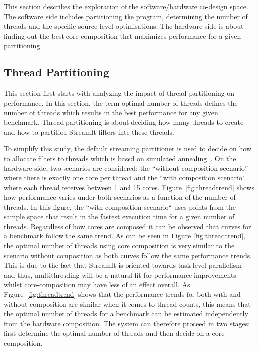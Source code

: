 This section describes the exploration of the software/hardware co-design space.
The software side includes partitioning the program, determining the number of threads and the specific source-level optimisations.
The hardware side is about finding out the best core composition that maximizes performance for a given partitioning.

\subsection{Thread Partitioning}

This section first starts with analyzing the impact of thread partitioning on performance.
In this section, the term optimal number of threads defines the number of threads which results in the best performance for any given benchmark.
Thread partitioning is about deciding how many threads to create and how to partition StreamIt filters into these threads.

To simplify this study, the default streaming partitioner is used to decide on how to allocate filters to threads which is based on simulated annealing~\cite{simulatedAnnealing1983}.
On the hardware side, two scenarios are considered: the ``without composition scenario'' where there is exactly one core per thread and the ``with composition scenario'' where each thread receives between 1 and 15 cores.
Figure~\ref{fig:threadtrend} shows how performance varies under both scenarios as a function of the number of threads.
In this figure, the ``with composition scenario`` uses points from the sample space that result in the fastest execution time for a given number of threads.
Regardless of how cores are composed it can be observed that curves for a benchmark follow the same trend.
As can be seen in Figure~\ref{fig:threadtrend}, the optimal number of threads using core composition is very similar to the scenario without composition as both curves follow the same performance trends.
This is due to the fact that StreamIt is oriented towards task-level parallelism and thus, multithreading will be a natural fit for performance improvements whilst core-composition may have less of an effect overall.
As Figure~\ref{fig:threadtrend} shows that the performance trends for both with and without composition are similar when it comes to thread counts, this  means that the optimal number of threads for a benchmark can be estimated independently from the hardware composition.
The system can therefore proceed in two stages: first determine the optimal number of threads and then decide on a core composition.

